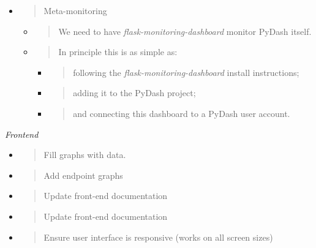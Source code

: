 \begin{itemize}
\item
  \begin{quote}
  Meta-monitoring
  \end{quote}
  \begin{itemize}
  \item
    \begin{quote}
    We need to have \emph{flask-monitoring-dashboard} monitor PyDash
    itself.
    \end{quote}
  \item
    \begin{quote}
    In principle this is as simple as:
    \end{quote}

    \begin{itemize}
    \item
      \begin{quote}
      following the \emph{flask-monitoring-dashboard} install
      instructions;
      \end{quote}
    \item
      \begin{quote}
      adding it to the PyDash project;
      \end{quote}
    \item
      \begin{quote}
      and connecting this dashboard to a PyDash user account.
      \end{quote}
    \end{itemize}
  \end{itemize}
\end{itemize}


\emph{Frontend}

\begin{itemize}
\item
  \begin{quote}
  Fill graphs with data.
  \end{quote}
\item
  \begin{quote}
  Add endpoint graphs
  \end{quote}
\item
  \begin{quote}
  Update front-end documentation
  \end{quote}
\item
  \begin{quote}
  Update front-end documentation
  \end{quote}
\item
  \begin{quote}
  Ensure user interface is responsive (works on all screen sizes)
  \end{quote}

\end{itemize}

